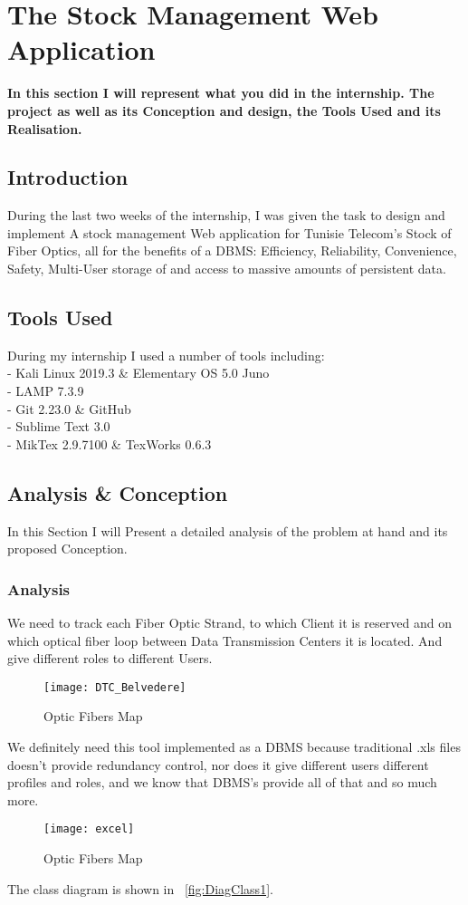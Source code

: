\chapter{The Stock Management Web Application} %
\label{chap:app}
\textbf{In this section I will represent what you did in the internship. The project as well as its Conception and design, the Tools Used and its Realisation.}

\section{Introduction}%
	During the last two weeks of the internship, I was given the task to design and implement A stock management Web application for Tunisie Telecom's Stock of Fiber Optics, all for the benefits of a DBMS:  Efficiency, Reliability, Convenience, Safety, Multi-User storage of and access to massive amounts of persistent data.
\section{Tools Used}
	During my internship I used a number of tools including: \\
		- Kali Linux 2019.3 \& Elementary OS 5.0 Juno\\
		- LAMP 7.3.9 \\
		- Git 2.23.0 \& GitHub\\
		- Sublime Text 3.0 \\
		- MikTex 2.9.7100 \& TexWorks 0.6.3 \\
\section{Analysis \& Conception} %
	In this Section I will Present a detailed analysis of the problem at hand and its proposed Conception.
\subsection{Analysis}
	We need to track each Fiber Optic Strand, to which Client it is reserved and on which optical fiber loop between Data Transmission Centers it is located. And give different roles to different Users.

\begin{figure}[ht!] %
  \centering
  \texttt{[image: DTC\_Belvedere]}
  \caption[DTC Belvedere]{Optic Fibers Map}%
  \label{fig:OFMap}
\end{figure}
We definitely need this tool implemented as a DBMS because traditional .xls files doesn't provide redundancy control, nor does it give different users different profiles and roles, and we know that DBMS's provide all of that and so much more.
\begin{figure}[ht!] %
  \centering
  \texttt{[image: excel]}
  \caption[Excel]{Optic Fibers Map}%
  \label{fig:HowTheyUsedToWork}
\end{figure}
The class diagram is shown in ~\ref{fig:DiagClass1}.
